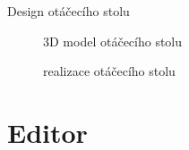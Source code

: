 \documentclass[czech]{beamer}
\begin{document}
\begin{frame}{Design otáčecího stolu}
		\begin{minipage}[t]{0.47\textwidth}
			\begin{figure}
				\centering
				\hfill
				\caption*{3D model otáčecího stolu}
			\end{figure}
		\end{minipage}%
		\hfill
		\begin{minipage}[t]{0.47\textwidth}
			\begin{figure}
				\centering
				\hfill
				\caption*{realizace otáčecího stolu}
			\end{figure}
		\end{minipage}
	\end{frame}

	\section{Editor}
\end{document}

